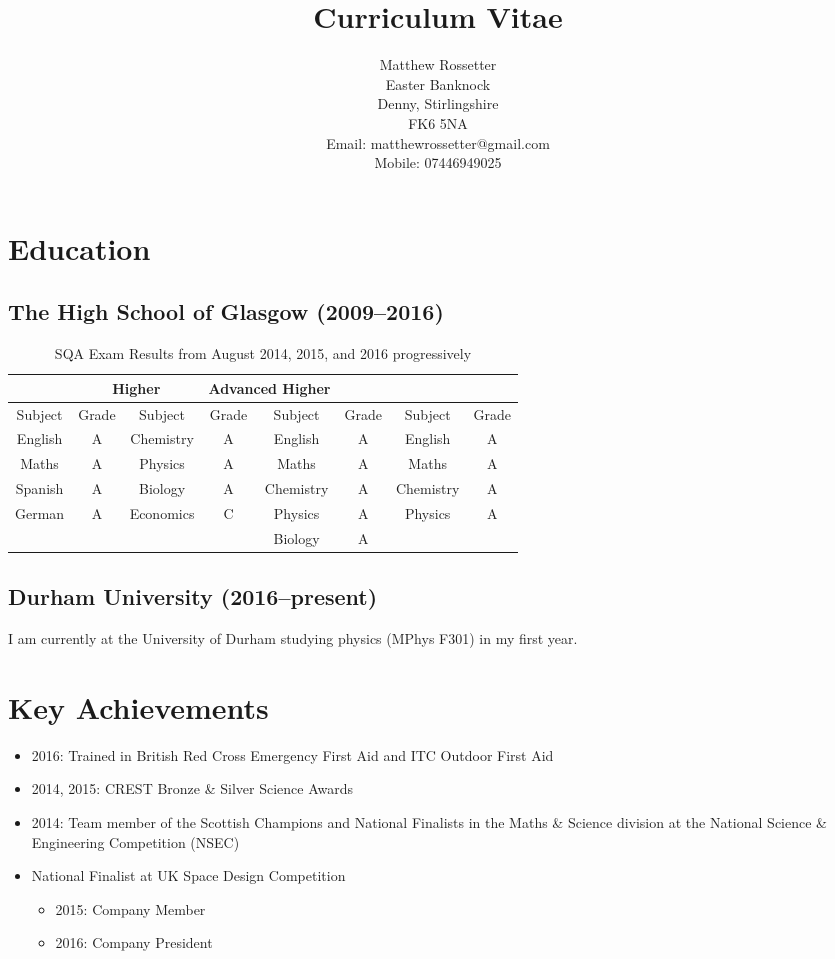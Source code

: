 \documentclass[10pt, a4paper]{article}
\title{\vspace{-2.2cm}Curriculum Vitae\vspace{-0.75cm}}
\author{Matthew Rossetter \\ Easter Banknock \\ Denny, Stirlingshire \\ FK6 5NA \\ Email: matthewrossetter@gmail.com \\ Mobile: 07446949025}
\date{\vspace{-1.5cm}}
\begin{document}
\maketitle

\thispagestyle{fancy}

\section{Education}
	\subsection{The High School of Glasgow (2009--2016)}
	\begin{table}[htbp]
		\centering
		\caption{SQA Exam Results from August 2014, 2015, and 2016 progressively}
    	\begin{tabular}{|c|c|c|c|c|c|c|c|}
			\hline
		    \rowcolor{lightgray} \multicolumn{4}{|c|}{National 5} & \multicolumn{2}{c|}{Higher} & \multicolumn{2}{c|}{Advanced Higher} \\
			\hline
		    \rowcolor{lightgray} Subject & Grade & Subject & Grade & Subject & Grade & Subject & Grade \\
			\hline
		    English & A & Chemistry & A & English & A & English & A \\
		   	Maths & A & Physics & A & Maths & A & Maths & A \\
		    Spanish & A & Biology & A & Chemistry & A & Chemistry & A \\
		    German & A & Economics & C & Physics & A & Physics & A \\
		          &       &       &       & Biology & A     &       &  \\
			\hline
		\end{tabular}%
	\end{table}%
	\subsection{Durham University (2016--present)}
	I am currently at the University of Durham studying physics (MPhys F301) in my first year.

\section{Key Achievements}
\begin{itemize}
	\item 2016: Trained in British Red Cross Emergency First Aid and ITC Outdoor First Aid
	\item 2014, 2015: CREST Bronze \& Silver Science Awards
	\item 2014: Team member of the Scottish Champions and National Finalists in the Maths \& Science division at the National Science \& Engineering Competition (NSEC)
	\item National Finalist at UK Space Design Competition
	\begin{itemize}
		\item 2015: Company Member
		\item 2016: Company President
	\end{itemize}
\end{itemize}
\end{document}
